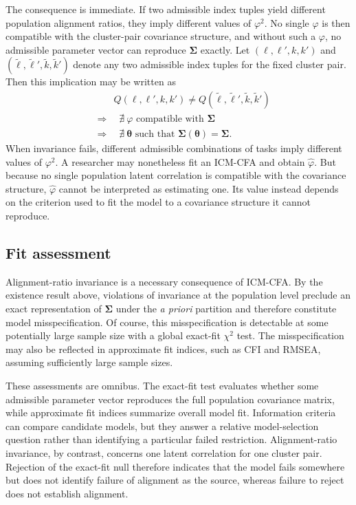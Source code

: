 \documentclass[
  american,
  man,floatsintext]{apa7}
\begin{document}
The consequence is immediate. If two admissible index tuples yield different population alignment ratios, they imply different values of \(\varphi^2\). No single \(\varphi\) is then compatible with the cluster-pair covariance structure, and without such a \(\varphi\), no admissible parameter vector can reproduce \(\pmb\Sigma\) exactly. Let \((\ell,\ell',k,k')\) and \((\tilde{\ell},\tilde{\ell}',\tilde{k},\tilde{k}')\) denote any two admissible index tuples for the fixed cluster pair. Then this implication may be written as
\[
\begin{aligned}
& \quad \quad Q(\ell,\ell',k,k')
\neq
Q(\tilde{\ell},\tilde{\ell}',\tilde{k},\tilde{k}')
\\
&\Longrightarrow\quad
\nexists \ \varphi
\text{ compatible with }
\pmb{\Sigma}
\\
&\Longrightarrow\quad
\nexists \ \pmb\theta
\text{ such that }
\pmb\Sigma(\pmb\theta)=\pmb\Sigma.
\end{aligned}
\]
When invariance fails, different admissible combinations of tasks imply different values of \(\varphi^2\). A researcher may nonetheless fit an ICM-CFA and obtain \(\widehat{\varphi}\). But because no single population latent correlation is compatible with the covariance structure, \(\widehat{\varphi}\) cannot be interpreted as estimating one. Its value instead depends on the criterion used to fit the model to a covariance structure it cannot reproduce.

\subsection{Fit assessment}\label{fit-assessment}

Alignment-ratio invariance is a necessary consequence of ICM-CFA. By the existence result above, violations of invariance at the population level preclude an exact representation of \(\pmb\Sigma\) under the \emph{a priori} partition and therefore constitute model misspecification. Of course, this misspecification is detectable at some potentially large sample size with a global exact-fit \(\chi^2\) test. The misspecification may also be reflected in approximate fit indices, such as CFI and RMSEA, assuming sufficiently large sample sizes.

These assessments are omnibus. The exact-fit test evaluates whether some admissible parameter vector reproduces the full population covariance matrix, while approximate fit indices summarize overall model fit. Information criteria can compare candidate models, but they answer a relative model-selection question rather than identifying a particular failed restriction. Alignment-ratio invariance, by contrast, concerns one latent correlation for one cluster pair. Rejection of the exact-fit null therefore indicates that the model fails somewhere but does not identify failure of alignment as the source, whereas failure to reject does not establish alignment.
\end{document}
